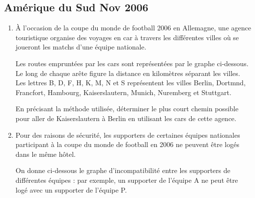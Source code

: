 \vfill\newpage
\subsection{Amérique du Sud Nov 2006}\label{amsn06} 
\begin{enumerate}
\item À l'occasion de la coupe du monde de football 2006 en Allemagne, une agence touristique organise des voyages en car à travers les différentes villes où se joueront les matchs d'une équipe nationale.

Les routes empruntées par les cars sont représentées par le graphe ci-dessous. Le long de chaque arête figure la distance en kilomètres séparant les villes.
Les lettres B, D, F, H, K, M, N et S représentent les villes Berlin, Dortmnd, Francfort, Hambourg, Kaiserslautern, Munich, Nuremberg et Stuttgart.

\bigskip

\begin{center}
\end{center}

\bigskip
En précisant la méthode utilisée, déterminer le plus court chemin possible pour aller de Kaiserslautern à Berlin en utilisant les cars de cette agence.
\item Pour des raisons de sécurité, les supporters de certaines équipes nationales participant à la coupe du monde de football en 2006 ne peuvent être logés dans le même hôtel.

On donne ci-dessous le graphe d'incompatibilité entre les supporters de différentes équipes : par exemple, un supporter de l'équipe A ne peut être logé avec un supporter de l'équipe P.


\end{enumerate}
